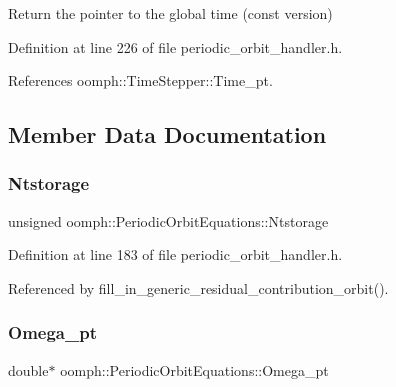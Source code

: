 Return the pointer to the global time (const version) 



Definition at line 226 of file periodic\+\_\+orbit\+\_\+handler.\+h.



References oomph\+::\+Time\+Stepper\+::\+Time\+\_\+pt.



\subsection{Member Data Documentation}
\mbox{\label{classoomph_1_1PeriodicOrbitEquations_a15f995392ba77c8c664c22df656efb60}} 
\subsubsection{\texorpdfstring{Ntstorage}{Ntstorage}}
{\footnotesize\ttfamily unsigned oomph\+::\+Periodic\+Orbit\+Equations\+::\+Ntstorage\hspace{0.3cm}{\ttfamily [private]}}



Definition at line 183 of file periodic\+\_\+orbit\+\_\+handler.\+h.



Referenced by fill\+\_\+in\+\_\+generic\+\_\+residual\+\_\+contribution\+\_\+orbit().

\mbox{\label{classoomph_1_1PeriodicOrbitEquations_a045a3ed37f016aeb55348c0703eacdbc}} 
\subsubsection{\texorpdfstring{Omega\+\_\+pt}{Omega\_pt}}
{\footnotesize\ttfamily double$\ast$ oomph\+::\+Periodic\+Orbit\+Equations\+::\+Omega\+\_\+pt\hspace{0.3cm}{\ttfamily [private]}}



